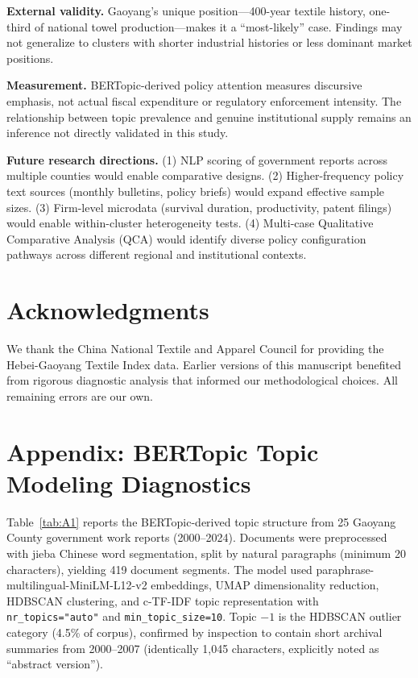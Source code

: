 \documentclass[a4paper, twoside, final]{article}
\begin{document}
\textbf{External validity.} Gaoyang's unique position---400-year textile history, one-third of national towel production---makes it a ``most-likely'' case. Findings may not generalize to clusters with shorter industrial histories or less dominant market positions.

\textbf{Measurement.} BERTopic-derived policy attention measures discursive emphasis, not actual fiscal expenditure or regulatory enforcement intensity. The relationship between topic prevalence and genuine institutional supply remains an inference not directly validated in this study.

\textbf{Future research directions.} (1) NLP scoring of government reports across multiple counties would enable comparative designs. (2) Higher-frequency policy text sources (monthly bulletins, policy briefs) would expand effective sample sizes. (3) Firm-level microdata (survival duration, productivity, patent filings) would enable within-cluster heterogeneity tests. (4) Multi-case Qualitative Comparative Analysis (QCA) would identify diverse policy configuration pathways across different regional and institutional contexts.

\section*{Acknowledgments}
We thank the China National Textile and Apparel Council for providing the Hebei-Gaoyang Textile Index data. Earlier versions of this manuscript benefited from rigorous diagnostic analysis that informed our methodological choices. All remaining errors are our own.



\newpage
\section{Appendix: BERTopic Topic Modeling Diagnostics}\label{sec:appendix}

Table~\ref{tab:A1} reports the BERTopic-derived topic structure from 25 Gaoyang County government work reports (2000--2024). Documents were preprocessed with jieba Chinese word segmentation, split by natural paragraphs (minimum 20 characters), yielding 419 document segments. The model used paraphrase-multilingual-MiniLM-L12-v2 embeddings, UMAP dimensionality reduction, HDBSCAN clustering, and c-TF-IDF topic representation with \texttt{nr\_topics="auto"} and \texttt{min\_topic\_size=10}. Topic $-1$ is the HDBSCAN outlier category (4.5\% of corpus), confirmed by inspection to contain short archival summaries from 2000--2007 (identically 1,045 characters, explicitly noted as ``abstract version'').
\end{document}
